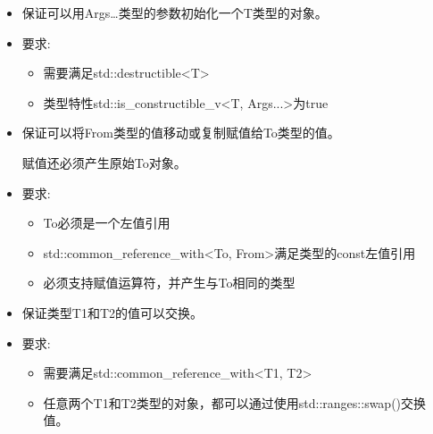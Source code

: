 
\begin{itemize}
\item
保证可以用Args…类型的参数初始化一个T类型的对象。

\item
要求:
\begin{itemize}
\item
需要满足std::destructible<T>

\item
类型特性std::is\_constructible\_v<T, Args...>为true
\end{itemize}
\end{itemize}


\begin{itemize}
\item
保证可以将From类型的值移动或复制赋值给To类型的值。

赋值还必须产生原始To对象。

\item
要求:
\begin{itemize}
\item
To必须是一个左值引用

\item
std::common\_reference\_with<To, From>满足类型的const左值引用

\item
必须支持赋值运算符，并产生与To相同的类型
\end{itemize}
\end{itemize}


\begin{itemize}
\item
保证类型T1和T2的值可以交换。

\item
要求:
\begin{itemize}
\item
需要满足std::common\_reference\_with<T1, T2>

\item
任意两个T1和T2类型的对象，都可以通过使用std::ranges::swap()交换值。
\end{itemize}
\end{itemize}


